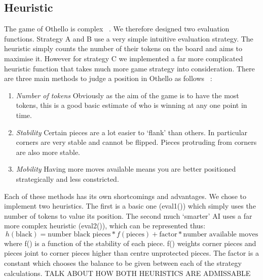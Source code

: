 \documentclass[12pt]{article}
\begin{document}
\subsection{Heuristic}
The game of Othello is complex ~\cite{post}. We therefore designed two evaluation functions. Strategy A and B use a very simple intuitive evaluation strategy. The heuristic simply counts the number of their tokens on the board and aims to maximise it. However for strategy C we implemented a far more complicated heuristic function that takes much more game strategy into consideration. There are three main methods to judge a position in Othello as follows ~\cite{strategy}:
\begin{enumerate}
\item \emph{Number of tokens} Obviously as the aim of the game is to have the most tokens, this is a good basic estimate of who is winning at any one point in time.
\item \emph{Stability} Certain pieces are a lot easier to `flank' than others. In particular corners are very stable and cannot be flipped. Pieces protruding from corners are also more stable.
\item \emph{Mobility} Having more moves available means you are better positioned strategically and less constricted.
\end{enumerate}
Each of these methods has its own shortcomings and advantages. We chose to implement two heuristics. The first is a basic one (eval1()) which simply uses the number of tokens to value its position. The second much `smarter' AI uses a far more complex heuristic (eval2()), which can be represented thus:
\begin{equation}
h(\mbox{black}) = \mbox{number black pieces}*f(\mbox{pieces}) + \mbox{factor}*\mbox{number available moves}
\end{equation}
where f() is a function of the stability of each piece. f() weights corner pieces and pieces joint to corner pieces higher than centre unprotected pieces. The factor is a constant which chooses the balance to be given between each of the strategy calculations.
TALK ABOUT HOW BOTH HEURISTICS ARE ADMISSABLE
\end{document}
